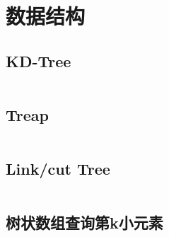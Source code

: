 \chapter{数据结构}
\section{KD-Tree}
\inputminted{cpp}{\source/data-structure/kd-tree.cpp}
\section{Treap}
\inputminted{cpp}{\source/data-structure/treap.cpp}
\section{Link/cut Tree}
\inputminted{cpp}{\source/data-structure/link-cut-tree.cpp}
\section{树状数组查询第k小元素}
\inputminted{cpp}{\source/data-structure/kth-element-on-fenwick-tree.cpp}
